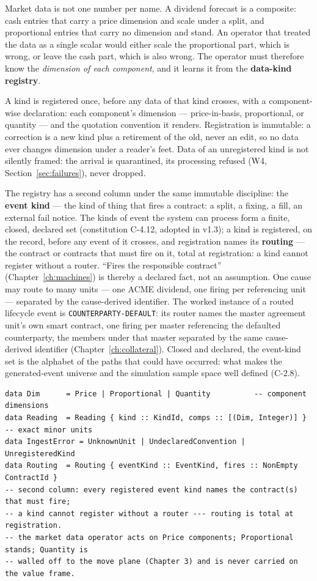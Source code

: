 \documentclass[11pt,a4paper]{article}
\begin{document}
Market data is not one number per name. A dividend forecast is a composite: cash entries
that carry a price dimension and scale under a split, and proportional entries that carry
no dimension and stand. An operator that treated the data as a single scalar would either
scale the proportional part, which is wrong, or leave the cash part, which is also wrong.
The operator must therefore know the \emph{dimension of each component}, and it learns it
from the \textbf{data-kind registry}.

A kind is registered once, before any data of that kind crosses, with a component-wise
declaration: each component's dimension --- price-in-basis, proportional, or quantity ---
and the quotation convention it renders. Registration is immutable: a correction is a new
kind plus a retirement of the old, never an edit, so no data ever changes dimension under
a reader's feet. Data of an unregistered kind is not silently framed: the arrival is
quarantined, its processing refused (W4, Section~\ref{sec:failures}), never dropped.

The registry has a second column under the same immutable discipline: the \textbf{event
kind} --- the kind of thing that fires a contract: a split, a fixing, a fill, an external
fail notice. The kinds of event the system can process form a finite, closed, declared set
(constitution C-4.12, adopted in v1.3); a kind is registered, on the record, before any
event of it crosses, and registration names its \textbf{routing} --- the contract or
contracts that must fire on it, total at registration: a kind cannot register without a
router. ``Fires the responsible contract'' (Chapter~\ref{ch:machines}) is thereby a
declared fact, not an assumption. One cause may route to many units --- one ACME dividend,
one firing per referencing unit --- separated by the cause-derived identifier. The worked
instance of a routed lifecycle event is \texttt{COUNTERPARTY-DEFAULT}: its router names the
master agreement unit's own smart contract, one firing per master referencing the defaulted
counterparty, the members under that master separated by the same cause-derived identifier
(Chapter~\ref{ch:collateral}). Closed and
declared, the event-kind set is the alphabet of the paths that could have occurred: what
makes the generated-event universe and the simulation sample space well defined (C-2.8).

\begin{lstlisting}
data Dim      = Price | Proportional | Quantity          -- component dimensions
data Reading  = Reading { kind :: KindId, comps :: [(Dim, Integer)] }  -- exact minor units
data IngestError = UnknownUnit | UndeclaredConvention | UnregisteredKind
data Routing  = Routing { eventKind :: EventKind, fires :: NonEmpty ContractId }
-- second column: every registered event kind names the contract(s) that must fire;
-- a kind cannot register without a router --- routing is total at registration.
-- the market data operator acts on Price components; Proportional stands; Quantity is
-- walled off to the move plane (Chapter 3) and is never carried on the value frame.
\end{lstlisting}
\end{document}
